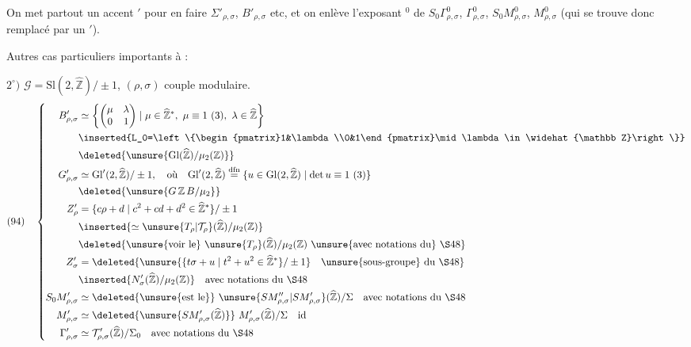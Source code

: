 On met partout un accent $'$ pour en faire $\Sigma'_{\rho,\sigma}$, $B'_{\rho,\sigma}$ etc, et on enlève l'exposant $^0$ de $S_0\Gamma_{\rho,\sigma}^0$, $\Gamma_{\rho,\sigma}^0$, $S_0M_{\rho,\sigma}^0$, $M_{\rho,\sigma}^0$ (qui se trouve donc remplacé par un $'$).

Autres cas particuliers importants à :

$2^\circ)$ $\mathcal G=\mathrm{Sl}(2,\widehat{\mathbb Z})/\pm1$, $(\rho,\sigma)$ couple modulaire.
\[
\begin{aligned}
(94)\quad\left\{\begin{aligned}
B'_{\rho,\sigma}&\simeq
\left\{\begin{pmatrix}\mu&\lambda\\0&1\end{pmatrix}
\mid\mu\in\widehat{\mathbb Z}^{*},\ \mu\equiv1\ (3),\ \lambda\in\widehat{\mathbb Z}\right\}\\
&\inserted{L_0=\left\{\begin{pmatrix}1&\lambda\\0&1\end{pmatrix}\mid\lambda\in\widehat{\mathbb Z}\right\}}\\
&\deleted{\unsure{\mathrm{Gl}(\widehat{\mathbb Z})/\mu_2(\mathbb Z)}}\\
G'_{\rho,\sigma}&\simeq\mathrm{Gl}'(2,\widehat{\mathbb Z})/\pm1,\quad\text{où}\quad
\mathrm{Gl}'(2,\widehat{\mathbb Z})\overset{\mathrm{dfn}}=
\{u\in\mathrm{Gl}(2,\widehat{\mathbb Z})\mid\det u\equiv1\ (3)\}\\
&\deleted{\unsure{G\,\mathbb Z\,B/\mu_2}}\\
Z'_{\rho}&=\{c\rho+d\mid c^2+cd+d^2\in\widehat{\mathbb Z}^{*}\}/\pm1\\
&\inserted{\simeq\unsure{T_\rho|\mathcal T_\rho}(\widehat{\mathbb Z})/\mu_2(\mathbb Z)}\\
&\deleted{\text{\unsure{voir le}}\ \unsure{T_\rho}(\widehat{\mathbb Z})/\mu_2(\mathbb Z)\ \text{\unsure{avec notations du} \S48}}\\
Z'_{\sigma}&=\deleted{\unsure{\{t\sigma+u\mid t^2+u^2\in\widehat{\mathbb Z}^{*}\}/\pm1}\quad\text{\unsure{sous-groupe} du \S48}}\\
&\inserted{N'_{\sigma}(\widehat{\mathbb Z})/\mu_2(\mathbb Z)}\quad\text{avec notations du \S48}\\
S_0M'_{\rho,\sigma}&\simeq\deleted{\text{\unsure{est le}}}\
\unsure{SM''_{\rho,\sigma}|SM'_{\rho,\sigma}}(\widehat{\mathbb Z})/\Sigma\quad\text{avec notations du \S48}\\
M'_{\rho,\sigma}&\simeq\deleted{\unsure{SM'_{\rho,\sigma}(\widehat{\mathbb Z})}}\
M'_{\rho,\sigma}(\widehat{\mathbb Z})/\Sigma\quad\text{id}\\
\Gamma'_{\rho,\sigma}&\simeq\mathcal T'_{\rho,\sigma}(\widehat{\mathbb Z})/\Sigma_0\quad\text{avec notations du \S48}
\end{aligned}\right.
\end{aligned}
\]


